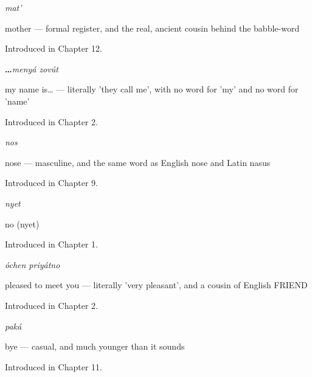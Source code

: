\noindent\begin{minipage}[t]{\linewidth}
\raggedright
\textbf{}\enspace\emph{mat'}\par
\small mother — formal register, and the real, ancient cousin behind the babble-word \par
\footnotesize Introduced in Chapter 12.
\end{minipage}\par\medskip

\noindent\begin{minipage}[t]{\linewidth}
\raggedright
\textbf{ …}\enspace\emph{menyá zovút}\par
\small my name is… — literally 'they call me', with no word for 'my' and no word for 'name'\par
\footnotesize Introduced in Chapter 2.
\end{minipage}\par\medskip

\noindent\begin{minipage}[t]{\linewidth}
\raggedright
\textbf{}\enspace\emph{nos}\par
\small nose — masculine, and the same word as English nose and Latin nasus\par
\footnotesize Introduced in Chapter 9.
\end{minipage}\par\medskip

\noindent\begin{minipage}[t]{\linewidth}
\raggedright
\textbf{}\enspace\emph{nyet}\par
\small no (nyet)\par
\footnotesize Introduced in Chapter 1.
\end{minipage}\par\medskip

\noindent\begin{minipage}[t]{\linewidth}
\raggedright
\textbf{ }\enspace\emph{óchen priyátno}\par
\small pleased to meet you — literally 'very pleasant', and a cousin of English FRIEND\par
\footnotesize Introduced in Chapter 2.
\end{minipage}\par\medskip

\noindent\begin{minipage}[t]{\linewidth}
\raggedright
\textbf{}\enspace\emph{paká}\par
\small bye — casual, and much younger than it sounds\par
\footnotesize Introduced in Chapter 11.
\end{minipage}\par\medskip

